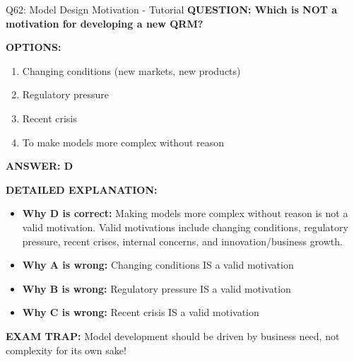 \documentclass[8pt]{beamer}
\begin{document}
	\begin{frame}{Q62: Model Design Motivation - Tutorial}
		\fontsize{6.5}{7.5}\selectfont
		\textbf{QUESTION: Which is NOT a motivation for developing a new QRM?}
		
		\vspace{0.1cm}
		\textbf{OPTIONS:}
		\begin{enumerate}
			\item Changing conditions (new markets, new products)
			\item Regulatory pressure
			\item Recent crisis
			\item To make models more complex without reason
		\end{enumerate}
		
		\vspace{0.1cm}
		\textcolor{myblue}{\textbf{ANSWER: D}}
		
		\vspace{0.1cm}
		\textbf{DETAILED EXPLANATION:}
		\begin{itemize}
			\item \textbf{Why D is correct:} Making models more complex without reason is not a valid motivation. Valid motivations include changing conditions, regulatory pressure, recent crises, internal concerns, and innovation/business growth.
			\item \textbf{Why A is wrong:} Changing conditions IS a valid motivation
			\item \textbf{Why B is wrong:} Regulatory pressure IS a valid motivation
			\item \textbf{Why C is wrong:} Recent crisis IS a valid motivation
		\end{itemize}
		
		\textcolor{myred}{\textbf{EXAM TRAP:}} Model development should be driven by \textcolor{myblue}{business need, not complexity for its own sake}!
	\end{frame}
	
\end{document}
